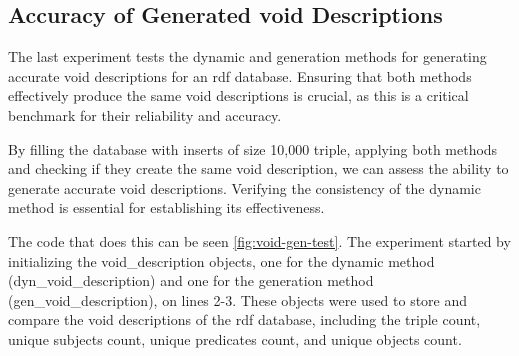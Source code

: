 \subsection{Accuracy of Generated \gls{void} Descriptions}\label{subsec:accuracy-of-generated-void-descriptions}
The last experiment tests the dynamic and generation methods for generating accurate \gls{void} descriptions for an  \gls{rdf} database. Ensuring that both methods effectively produce the same \gls{void} descriptions is crucial, as this is a critical benchmark for their reliability and accuracy.

By filling the database with inserts of size 10,000 triple, applying both methods and checking if they create the same \gls{void} description, we can assess the ability to generate accurate \gls{void} descriptions. Verifying the consistency of the dynamic method is essential for establishing its effectiveness.

The code that does this can be seen \autoref{fig:void-gen-test}. The experiment started by initializing the void\_description objects, one for the dynamic method (dyn\_void\_description) and one for the generation method (gen\_void\_description), on lines 2-3. These objects were used to store and compare the \gls{void} descriptions of the  \gls{rdf} database, including the triple count, unique subjects count, unique predicates count, and unique objects count.

